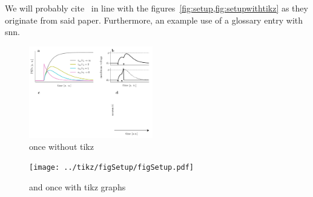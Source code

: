 We will probably cite~\cite{goeltz2020fast} in line with the figures~\cref{fig:setup,fig:setupwithtikz} as they originate from said paper.
Furthermore, an example use of a glossary entry with \gls{snn}.

\lipsum[2]


\begin{figure}
  \centering
  \includegraphics[width=0.48\textwidth]{../../fig/figSetup.pdf}
  \caption{
      once without tikz
  }\label{fig:setup}
\end{figure}



\begin{figure}
  \centering
  \texttt{[image: ../tikz/figSetup/figSetup.pdf]}
  \caption{
      and once with tikz graphs
  }\label{fig:setupwithtikz}
\end{figure}
